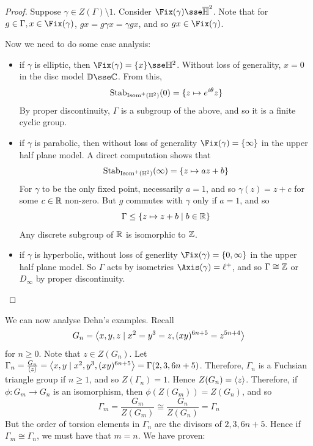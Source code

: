 \documentclass{article}
\begin{document}
\begin{proof}
    Suppose \(\gamma \in Z(\Gamma) \setminus 1\). Consider \(\Fix(\gamma) \sse \overline{\bb H}^2\). Note that for \(g \in \Gamma, x \in \Fix(\gamma)\), \(gx = g\gamma x = \gamma gx\), and so \(gx \in \Fix(\gamma)\).

    \lec

    Now we need to do some case analysis:
    \begin{itemize}
        \item if \(\gamma\) is elliptic, then \(\Fix(\gamma) = \{x\} \sse \bb H^2\). Without loss of generality, \(x = 0\) in the disc model \(\bb D \sse \C\). From this,
        \[\operatorname{Stab}_{\operatorname{Isom}^+(\mathbb{H}^2)}(0) = \{z \mapsto e^{i\theta}z\}\]
        By proper discontinuity, \(\Gamma\) is a subgroup of the above, and so it is a finite cyclic group.
        \item if \(\gamma\) is parabolic, then without loss of generality \(\Fix(\gamma) = \{\infty\}\) in the upper half plane model. A direct computation shows that
        \[\operatorname{Stab}_{\operatorname{Isom}^+(\mathbb{H}^2)}(\infty) = \{z \mapsto az + b\}\]
        For \(\gamma\) to be the only fixed point, necessarily \(a = 1\), and so \(\gamma(z) = z + c\) for some \(c \in \mathbb{R}\) non-zero. But \(g\) commutes with \(\gamma\) only if \(a = 1\), and so
        \[\Gamma \le \{z \mapsto z + b \mid b \in \mathbb{R}\}\]
        Any discrete subgroup of \(\mathbb{R}\) is isomorphic to \(\mathbb{Z}\).
        \item if \(\gamma\) is hyperbolic, without loss of generlity \(\Fix(\gamma) = \{0, \infty\}\) in the upper half plane model. So \(\Gamma\) acts by isometries \(\Axis(\gamma) = \ell^+\), and so \(\Gamma \cong \mathbb{Z}\) or \(D_\infty\) by proper discontinuity.
    \end{itemize}
\end{proof}

We can now analyse Dehn's examples. Recall
\[G_n = \left\langle x,y,z \mid x^2 = y^3 = z, (xy)^{6n+5} = z^{5n+4} \right\rangle\]
for \(n \ge 0\). Note that \(z \in Z(G_n)\). Let 
\(\Gamma_n = \frac{G_n}{\left\langle z \right\rangle} = \left\langle x, y \mid x^2, y^3, (xy)^{6n+5} \right\rangle = \Gamma(2, 3, 6n+5)\). Therefore, \(\Gamma_n\) is a Fuchsian triangle group if \(n \ge 1\), and so \(Z(\Gamma_n) = 1\). Hence \(Z(G_n) = \left\langle z \right\rangle\). Therefore, if \(\phi : G_m \to G_n\) is an isomorphism, then \(\phi(Z(G_m)) = Z(G_n)\), and so
\[\Gamma_m = \frac{G_m}{Z(G_m)} \cong \frac{G_n}{Z(G_n)} = \Gamma_n\]
But the order of torsion elements in \(\Gamma_n\) are the divisors of \(2, 3, 6n+5\). Hence if \(\Gamma_m \cong \Gamma_n\), we must have that \(m = n\). We have proven:
\end{document}
